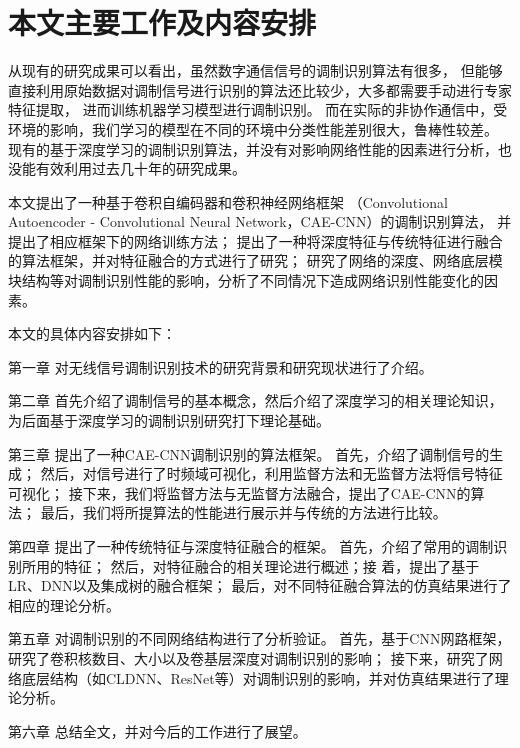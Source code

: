 \section{本文主要工作及内容安排}
从现有的研究成果可以看出，虽然数字通信信号的调制识别算法有很多，
但能够直接利用原始数据对调制信号进行识别的算法还比较少，大多都需要手动进行专家特征提取，
进而训练机器学习模型进行调制识别。
而在实际的非协作通信中，受环境的影响，我们学习的模型在不同的环境中分类性能差别很大，鲁棒性较差。
现有的基于深度学习的调制识别算法，并没有对影响网络性能的因素进行分析，也没能有效利用过去几十年的研究成果。\par

本文提出了一种基于卷积自编码器和卷积神经网络框架
（Convolutional Autoencoder - Convolutional Neural Network，CAE-CNN）的调制识别算法，
并提出了相应框架下的网络训练方法；
提出了一种将深度特征与传统特征进行融合的算法框架，并对特征融合的方式进行了研究；
研究了网络的深度、网络底层模块结构等对调制识别性能的影响，分析了不同情况下造成网络识别性能变化的因素。 \par

本文的具体内容安排如下：

第一章 对无线信号调制识别技术的研究背景和研究现状进行了介绍。\par

第二章 首先介绍了调制信号的基本概念，然后介绍了深度学习的相关理论知识，
为后面基于深度学习的调制识别研究打下理论基础。 \par

第三章 提出了一种CAE-CNN调制识别的算法框架。
首先，介绍了调制信号的生成；
然后，对信号进行了时频域可视化，利用监督方法和无监督方法将信号特征可视化；
接下来，我们将监督方法与无监督方法融合，提出了CAE-CNN的算法；
最后，我们将所提算法的性能进行展示并与传统的方法进行比较。 \par

第四章 提出了一种传统特征与深度特征融合的框架。
首先，介绍了常用的调制识别所用的特征；
然后，对特征融合的相关理论进行概述；接
着，提出了基于LR、DNN以及集成树的融合框架；
最后，对不同特征融合算法的仿真结果进行了相应的理论分析。 \par

第五章 对调制识别的不同网络结构进行了分析验证。
首先，基于CNN网路框架，研究了卷积核数目、大小以及卷基层深度对调制识别的影响；
接下来，研究了网络底层结构（如CLDNN、ResNet等）对调制识别的影响，并对仿真结果进行了理论分析。\par

第六章 总结全文，并对今后的工作进行了展望。\par